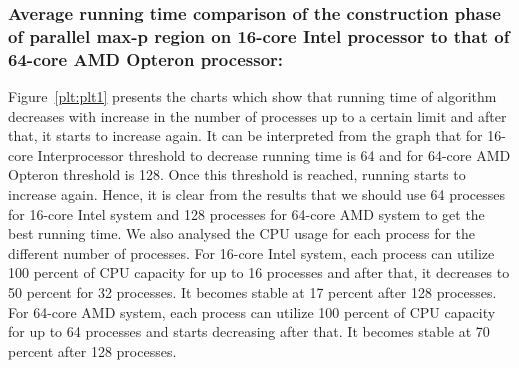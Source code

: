 \documentclass[conference]{IEEEtran}
\begin{document}
\subsubsection*{Average running time comparison of the construction phase of parallel max-p
region on 16-core Intel processor to that of 64-core AMD Opteron processor:}
 Figure~\ref{plt:plt1} presents the charts which
show that running time of algorithm decreases with increase in the number of
processes up to a certain limit and after that, it starts to increase again. It can
be interpreted from the graph that for 16-core Interprocessor threshold to
decrease running time is 64 and for 64-core AMD Opteron threshold is 128. Once
this threshold is reached, running starts to increase again. Hence, it is clear
from the results that we should use 64 processes for 16-core Intel system and
128 processes for 64-core AMD system to get the best running time. We also
analysed the CPU usage for each process for the different number of processes. For
16-core Intel system, each process can utilize 100 percent of CPU
capacity for up to 16 processes and after that, it decreases to 50 percent for 32
processes. It becomes stable at 17 percent after 128 processes. For 64-core AMD
system, each process can utilize 100 percent of CPU capacity for up to 64
processes and starts decreasing after that. It becomes stable at 70 percent
after 128 processes.
\end{document}

